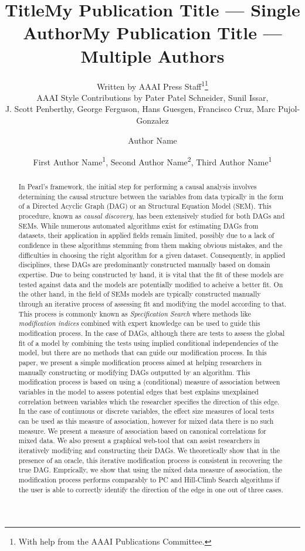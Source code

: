 \documentclass[letterpaper]{article} %
\title{Title}
\author{
    Written by AAAI Press Staff\textsuperscript{\rm 1}\thanks{With help from the AAAI Publications Committee.}\\
    AAAI Style Contributions by Pater Patel Schneider,
    Sunil Issar,\\
    J. Scott Penberthy,
    George Ferguson,
    Hans Guesgen,
    Francisco Cruz\equalcontrib,
    Marc Pujol-Gonzalez\equalcontrib
}
\title{My Publication Title --- Single Author}
\author {
    Author Name
}
\title{My Publication Title --- Multiple Authors}
\author {
    First Author Name\textsuperscript{\rm 1},
    Second Author Name\textsuperscript{\rm 2},
    Third Author Name\textsuperscript{\rm 1}
}
\begin{document}
\maketitle

\begin{abstract}
	In Pearl's framework, the initial step for performing a causal analysis
	involves determining the causal structure between the variables from
	data typically in the form of a Directed Acyclic Graph (DAG) or an
	Structural Equation Model (SEM). This procedure, known as \emph{causal
	discovery}, has been extensively studied for both DAGs and SEMs. While
	numerous automated algorithms exist for estimating DAGs from datasets,
	their application in applied fields remain limited, possibly due to a
	lack of confidence in these algorithms stemming from them making
	obvious mistakes, and the difficulties in choosing the right algorithm
	for a given dataset. Consequently, in applied disciplines, these DAGs
	are predominantly constructed manually based on domain expertise. Due
	to being constructed by hand, it is vital that the fit of these models
	are tested against data and the models are potentially modified to
	acheive a better fit. On the other hand, in the field of SEMs models
	are typically constructed manually through an iterative process of
	assessing fit and modifying the model according to that. This process
	is commonly known as \emph{Specification Search} where methods like
	\emph{modification indices} combined with expert knowledge can be used
	to guide this modification process. In the case of DAGs, although there
	are tests to assess the global fit of a model by combining the tests
	using implied conditional independencies of the model, but there are no
	methods that can guide our modification process. In this paper, we
	present a simple modification process aimed at helping researchers in
	manually constructing or modifying DAGs outputted by an algorithm. This
	modification process is based on using a (conditional) measure of
	association between variables in the model to assess potential edges
	that best explains unexplained correlation between variables which the
	researcher specifies the direction of this edge. In the case of
	continuous or discrete variables, the effect size measures of local
	tests can be used as this measure of association, however for mixed
	data there is no such measure. We present a measure of association
	based on canonical correlations for mixed data. We also present a
	graphical web-tool that can assist researchers in iteratively modifying
	and constructing their DAGs. We theoretically show that in the presence
	of an oracle, this iterative modification process is consistent in
	recovering the true DAG. Emprically, we show that using the mixed data
	measure of association, the modification process performs comparably to
	PC and Hill-Climb Search algorithms if the user is able to correctly
	identify the direction of the edge in one out of three cases.
\end{abstract}
\end{document}

